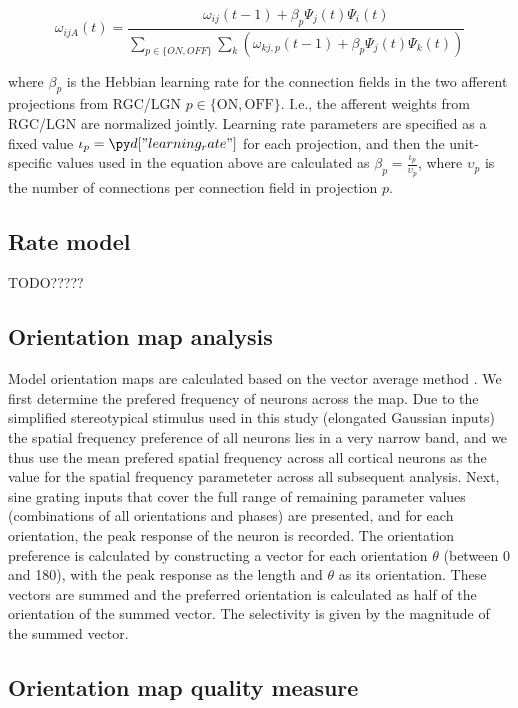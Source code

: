 \documentclass[a4paper,10pt]{article}
\begin{document}
\begin{equation}
\omega_{ijA}(t)=\frac{\omega_{ij}(t-1)+\beta_{p}\Psi_{j}(t)\Psi_{i}(t)}{\sum_{p \in \{ON,OFF\}}\sum_{k}\left(\omega_{kj,p}(t-1)+\beta_{p}\Psi_{j}(t)\Psi_{k}(t)\right)}
\end{equation}

where $\beta_{p}$ is the Hebbian learning rate for the connection fields in the two afferent projections from RGC/LGN $p \in \{\mathrm{ON},\mathrm{OFF}\}$. I.e., the afferent weights from RGC/LGN are normalized jointly.  Learning rate parameters are specified as
a fixed value $\iota_{p}=\insval{learning_rate}$ for each projection, and then the unit-specific values used in the equation above are calculated as
$\beta_{p}=\frac{\iota_{p}}{\upsilon_{p}}$, where $\upsilon_{p}$ is the number of connections per connection field in projection $p$.  

\subsection{Rate model}

TODO?????

\subsection{Orientation map analysis}

Model orientation maps are calculated based on the vector average method \cite{CMVC}. We first determine the prefered frequency of neurons 
across the map. Due to the simplified stereotypical stimulus used in this study (elongated Gaussian inputs) the spatial frequency 
preference of all neurons lies in a very narrow band, and we thus use the mean prefered spatial frequency across all cortical neurons as the
value for the spatial frequency parameteter across all subsequent analysis. Next, sine grating inputs that cover the full range of remaining parameter values (combinations of all orientations and phases) are presented, and for each orientation, the peak response of the neuron is recorded. The orientation preference is calculated by constructing a vector for each orientation $\theta$ (between 0 and 180\circ), with the peak response as
the length and $\theta$ as its orientation. These vectors are summed and the preferred orientation is calculated as half of the orientation of the summed vector. The selectivity is given by the magnitude of the summed vector. 

\subsection{Orientation map quality measure}
\end{document}
